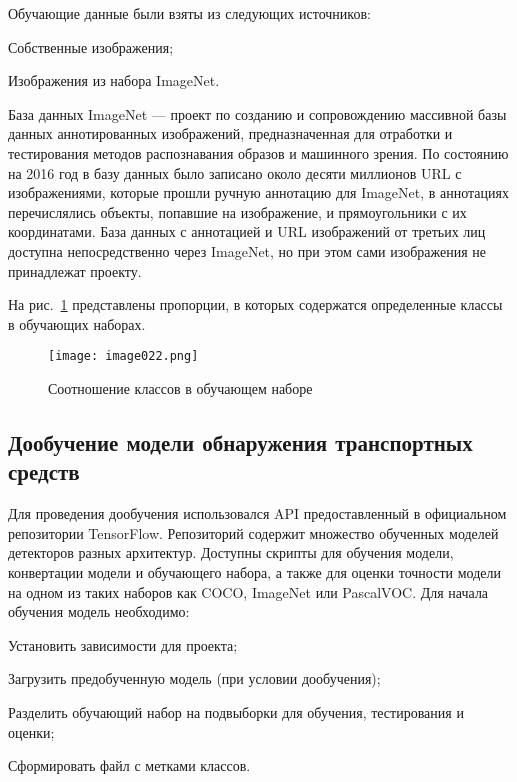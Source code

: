 Обучающие данные были взяты из следующих источников:
%
\begin{itemize*}
  \item Собственные изображения;
  \item Изображения из набора ImageNet\cite{nineteen}.
\end{itemize*}
%

База данных ImageNet — проект по созданию и сопровождению массивной базы данных аннотированных изображений, предназначенная для отработки и тестирования методов распознавания образов и машинного зрения. По состоянию на 2016 год в базу данных было записано около десяти миллионов URL с изображениями, которые прошли ручную аннотацию для ImageNet, в аннотациях перечислялись объекты, попавшие на изображение, и прямоугольники с их координатами. База данных с аннотацией и URL изображений от третьих лиц доступна непосредственно через ImageNet, но при этом сами изображения не принадлежат проекту.

На рис.~\ref{fig:datasubsetproportions} представлены пропорции, в которых содержатся определенные классы в обучающих наборах.

\begin{figure}[htbp]
\centering
\texttt{[image: image022.png]}
\caption{Соотношение классов в обучающем наборе}%
\label{fig:datasubsetproportions}
\end{figure}

\subsection{Дообучение модели обнаружения транспортных средств}

Для проведения дообучения использовался API предоставленный в официальном репозитории TensorFlow\cite{twenty}. Репозиторий содержит множество обученных моделей детекторов разных архитектур. Доступны скрипты для обучения модели, конвертации модели и обучающего набора, а также для оценки точности модели на одном из таких наборов как COCO, ImageNet или PascalVOC. Для начала обучения модель необходимо:
%
\begin{itemize*}
  \item Установить зависимости для проекта;
  \item Загрузить предобученную модель (при условии дообучения);
  \item Разделить обучающий набор на подвыборки для обучения, тестирования и оценки;
  \item Сформировать файл с метками классов.
\end{itemize*}
%

